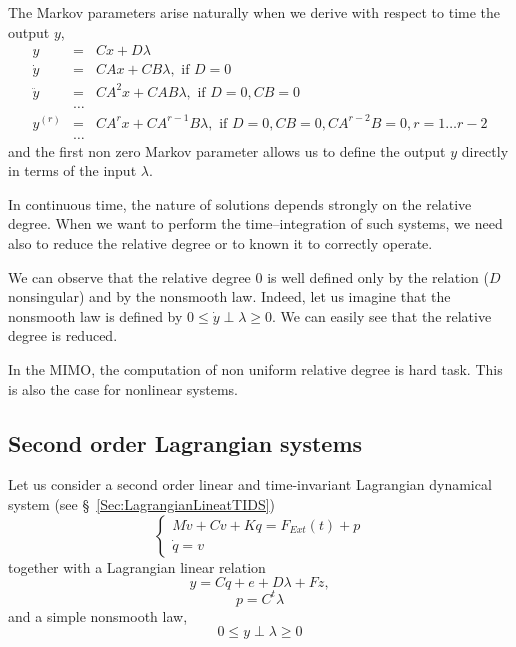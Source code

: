     The Markov parameters arise naturally when we derive with respect
    to time the output $y$,
    \begin{eqnarray*}
      \label{eq:y-derive}
      y &=& C x + D \lambda \\
      \dot y &=& CA x + CB \lambda, \text{ if } D= 0  \\
      \ddot y &=& CA^2 x + CAB \lambda, \text{ if }  D=0, CB=0\\
      &\ldots& \\
      y^{(r)} &=& CA^{r} x + CA^{r-1}B \lambda, \text{ if } D=0, CB=0, CA^{r-2}B=0, r=1\ldots r-2 \\
      &\ldots&
    \end{eqnarray*}
    and the first non zero Markov parameter allows us to define the
    output $y$ directly in terms of the input $\lambda$.

In continuous time, the nature of solutions depends strongly on the relative degree. When we want to perform the time--integration of such systems, we need also to reduce the relative degree or to known it to correctly operate.

We can observe that the relative degree $0$ is well defined only by the relation ($D$ nonsingular) and by the nonsmooth law. Indeed, let us imagine that the nonsmooth law is defined by $0\leq\dot y \perp \lambda \geq 0 $. We can easily see that the relative degree is reduced.

In the MIMO, the computation of non uniform relative degree is hard task. This is also the case for nonlinear systems.



\subsection{Second order Lagrangian systems}


Let us consider a second order linear and time-invariant Lagrangian dynamical system (see \S~\ref{Sec:LagrangianLineatTIDS})
\begin{equation}
  \label{eq:rd1}
  \begin{cases}
    M \dot v + C v + K q = F_{Ext}(t) + p \\
    \dot q = v
  \end{cases}
\end{equation}
together with a Lagrangian linear relation
\begin{equation}
  y= Cq + e + D \lambda + Fz,
  \label{eq:rd2}
\end{equation}
\begin{equation}
  p = C^t \lambda
\label{eq:rd3}
\end{equation}
and a simple nonsmooth law,
\begin{equation}
  0\leq y \perp \lambda \geq 0
\label{eq:rd4}
\end{equation}

